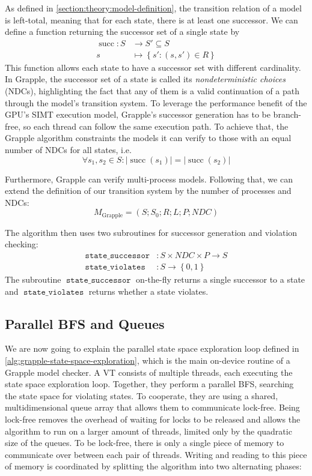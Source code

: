 \documentclass[
fancyheadings, %
%
%
]{stsreprt}
\DeclareMathOperator{\sSuccessor}{\texttt{state\_successor}}
\DeclareMathOperator{\sViolates}{\texttt{state\_violates}}
\begin{document}
As defined in \cref{section:theory:model-definition}, the transition relation of a model is left-total, meaning that for each state, there is at least one successor.
We can define a function returning the successor set of a single state by
\begin{align*}
    \operatorname{succ} : S & \to S' \subseteq S                          \\
    s                       & \mapsto \left\{ s' : (s, s') \in R \right\}
\end{align*}
This function allows each state to have a successor set with different cardinality.
In Grapple, the successor set of a state is called its \emph{nondeterministic choices} (NDCs), highlighting the fact that any of them is a valid continuation of a path through the model's transition system.
To leverage the performance benefit of the GPU's SIMT execution model, Grapple's successor generation has to be branch-free, so each thread can follow the same execution path.
To achieve that, the Grapple algorithm constraints the models it can verify to those with an equal number of NDCs for all states, i.e.\[ \forall s_1, s_2 \in S : |\operatorname{succ}(s_1)| = |\operatorname{succ}(s_2)| \]

Furthermore, Grapple can verify multi-process models.
Following that, we can extend the definition of our transition system by the number of processes and NDCs: \[M_{\text{Grapple}} = \left(S; S_0; R; L; P; \mathit{NDC}\right)\]

The algorithm then uses two subroutines for successor generation and violation checking:
\begin{align*}
    \sSuccessor & : S \times \mathit{NDC} \times \mathit{P}  \to S \\
    \sViolates  & : S \to \left\{0, 1\right\}
\end{align*}
The subroutine $\sSuccessor$ on-the-fly returns a single successor to a state and $\sViolates$ returns whether a state violates.

\subsection{Parallel BFS and Queues}
\label{section:theory:queues}

We are now going to explain the parallel state space exploration loop defined in \cref{alg:grapple-state-space-exploration}, which is the main on-device routine of a Grapple model checker.
A VT consists of multiple threads, each executing the state space exploration loop.
Together, they perform a parallel BFS, searching the state space for violating states.
To cooperate, they are using a shared, multidimensional queue array that allows them to communicate lock-free.
Being lock-free removes the overhead of waiting for locks to be released and allows the algorithm to run on a larger amount of threads, limited only by the quadratic size of the queues.
To be lock-free, there is only a single piece of memory to communicate over between each pair of threads.
Writing and reading to this piece of memory is coordinated by splitting the algorithm into two alternating phases:
\end{document}
